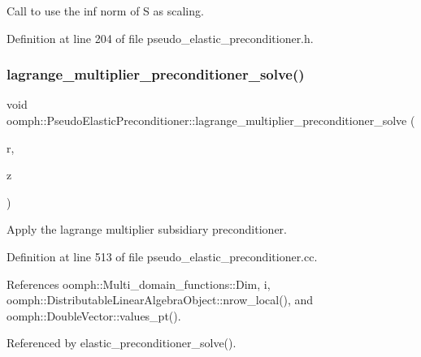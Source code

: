Call to use the inf norm of S as scaling. 



Definition at line 204 of file pseudo\+\_\+elastic\+\_\+preconditioner.\+h.

\mbox{\label{classoomph_1_1PseudoElasticPreconditioner_a071ddbc46bb55f2c11fe0dfe9b69bb4a}} 
\subsubsection{\texorpdfstring{lagrange\+\_\+multiplier\+\_\+preconditioner\+\_\+solve()}{lagrange\_multiplier\_preconditioner\_solve()}}
{\footnotesize\ttfamily void oomph\+::\+Pseudo\+Elastic\+Preconditioner\+::lagrange\+\_\+multiplier\+\_\+preconditioner\+\_\+solve (\begin{DoxyParamCaption}\item[{const \hyperlink{classoomph_1_1DoubleVector}{Double\+Vector} \&}]{r,  }\item[{\hyperlink{classoomph_1_1DoubleVector}{Double\+Vector} \&}]{z }\end{DoxyParamCaption})\hspace{0.3cm}{\ttfamily [private]}}



Apply the lagrange multiplier subsidiary preconditioner. 



Definition at line 513 of file pseudo\+\_\+elastic\+\_\+preconditioner.\+cc.



References oomph\+::\+Multi\+\_\+domain\+\_\+functions\+::\+Dim, i, oomph\+::\+Distributable\+Linear\+Algebra\+Object\+::nrow\+\_\+local(), and oomph\+::\+Double\+Vector\+::values\+\_\+pt().



Referenced by elastic\+\_\+preconditioner\+\_\+solve().

\mbox{\label{classoomph_1_1PseudoElasticPreconditioner_a2533d2574d2c7d6613fda72b96a5f885}} 
